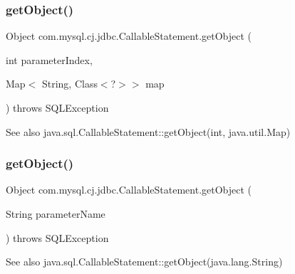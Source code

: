 \subsubsection{\texorpdfstring{get\+Object()}{getObject()}\hspace{0.1cm}{\footnotesize\ttfamily [2/4]}}
{\footnotesize\ttfamily Object com.\+mysql.\+cj.\+jdbc.\+Callable\+Statement.\+get\+Object (\begin{DoxyParamCaption}\item[{int}]{parameter\+Index,  }\item[{Map$<$ String, Class$<$?$>$$>$}]{map }\end{DoxyParamCaption}) throws S\+Q\+L\+Exception}

\begin{DoxySeeAlso}{See also}
java.\+sql.\+Callable\+Statement\+::get\+Object(int, java.\+util.\+Map) 
\end{DoxySeeAlso}
\mbox{\label{classcom_1_1mysql_1_1cj_1_1jdbc_1_1_callable_statement_a6166a1c8cd33dbb53750d37513d29365}} 
\subsubsection{\texorpdfstring{get\+Object()}{getObject()}\hspace{0.1cm}{\footnotesize\ttfamily [3/4]}}
{\footnotesize\ttfamily Object com.\+mysql.\+cj.\+jdbc.\+Callable\+Statement.\+get\+Object (\begin{DoxyParamCaption}\item[{String}]{parameter\+Name }\end{DoxyParamCaption}) throws S\+Q\+L\+Exception}

\begin{DoxySeeAlso}{See also}
java.\+sql.\+Callable\+Statement\+::get\+Object(java.\+lang.\+String) 
\end{DoxySeeAlso}
\mbox{\label{classcom_1_1mysql_1_1cj_1_1jdbc_1_1_callable_statement_a367ba176bf87e7f1ec648719163ccfe1}} 
